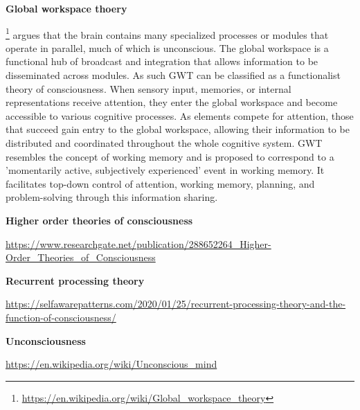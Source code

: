 \documentclass{book}
\providecommand{\ProjectDeepHeading}[2]{%
    \par\medskip\noindent\textbf{#2}\par\smallskip
}
\providecommand{\clickurlfooter}[1]{\footnote{\url{#1}}}
\begin{document}
\ProjectDeepHeading{4}{Global workspace thoery}


\clickurlfooter{https://en.wikipedia.org/wiki/Global_workspace_theory} argues that the brain contains many specialized processes or modules that operate in parallel, much of which is unconscious. The global workspace is a functional hub of broadcast and integration that allows information to be disseminated across modules. As such GWT can be classified as a functionalist theory of consciousness. When sensory input, memories, or internal representations receive attention, they enter the global workspace and become accessible to various cognitive processes. As elements compete for attention, those that succeed gain entry to the global workspace, allowing their information to be distributed and coordinated throughout the whole cognitive system. GWT resembles the concept of working memory and is proposed to correspond to a 'momentarily active, subjectively experienced' event in working memory. It facilitates top-down control of attention, working memory, planning, and problem-solving through this information sharing.

\ProjectDeepHeading{4}{Higher order theories of consciousness}


\url{https://www.researchgate.net/publication/288652264_Higher-Order_Theories_of_Consciousness}

\ProjectDeepHeading{4}{Recurrent processing theory}


\url{https://selfawarepatterns.com/2020/01/25/recurrent-processing-theory-and-the-function-of-consciousness/}

\ProjectDeepHeading{1}{Unconsciousness}


\url{https://en.wikipedia.org/wiki/Unconscious_mind}
    
\end{document}
